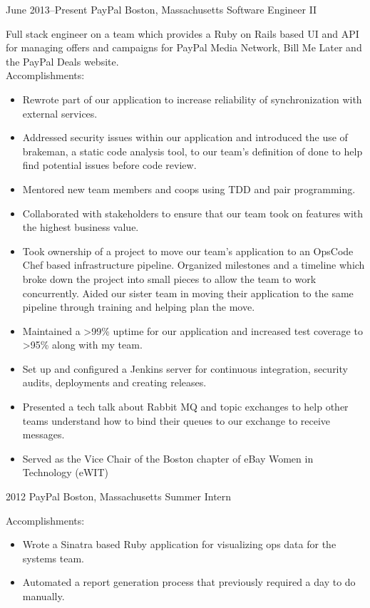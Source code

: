 \documentclass[]{friggeri-cv}
\begin{document}
\begin{entrylist}
  \entryalt
    {June 2013--Present}
    {PayPal}
    {Boston, Massachusetts}
    {Software Engineer II}
    {Full stack engineer on a team which provides a Ruby on Rails based UI and API for managing offers and campaigns for PayPal Media Network, Bill Me Later and the PayPal Deals website. \\
    Accomplishments:
    \begin{itemize}
      \item Rewrote part of our application to increase reliability of synchronization with external services.
      \item Addressed security issues within our application and introduced the use of brakeman, a static code analysis tool, to our team's definition of done to help find potential issues before code review.
      \item Mentored new team members and coops using TDD and pair programming.
      \item Collaborated with stakeholders to ensure that our team took on features with the highest business value.
      \item Took ownership of a project to move our team's application to an OpsCode Chef based infrastructure pipeline. Organized milestones and a timeline which broke down the project into small pieces to allow the team to work concurrently. Aided our sister team in moving their application to the same pipeline through training and helping plan the move.
      \item Maintained a >99\% uptime for our application and increased test coverage to >95\% along with my team.
      \item Set up and configured a Jenkins server for continuous integration, security audits, deployments and creating releases.
      \item Presented a tech talk about Rabbit MQ and topic exchanges to help other teams understand how to bind their queues to our exchange to receive messages.
      \item Served as the Vice Chair of the Boston chapter of eBay Women in Technology (eWIT)
    \end{itemize}}
  \entryalt
    {2012}
    {PayPal}
    {Boston, Massachusetts}
    {Summer Intern}
    {Accomplishments:
    \begin{itemize}
      \item Wrote a Sinatra based Ruby application for visualizing ops data for the systems team.
      \item Automated a report generation process that previously required a day to do manually.
    \end{itemize}}
\end{entrylist}
\end{document}
